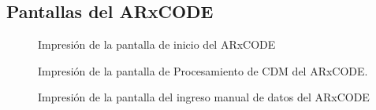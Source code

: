 \subsection*{Pantallas del ARxCODE}


\begin{figure}[h!]
  \centering
  \caption{Impresi\'on de la pantalla de inicio del ARxCODE}
  \label{fig:pantInicio}
\end{figure}

\begin{figure}[h!]
  \centering
  \caption{Impresi\'on de la pantalla de Procesamiento de CDM del ARxCODE.}
  \label{fig:ingresadatosPant}
\end{figure}

\begin{figure}[h!]
  \centering
  \caption{Impresi\'on de la pantalla del ingreso manual de datos del ARxCODE}
  \label{fig:ingresadatosPant1}
\end{figure}


